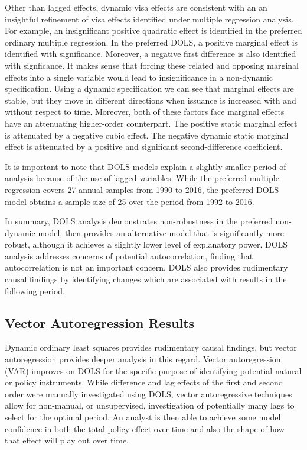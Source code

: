 \documentclass[review]{elsarticle}
\begin{document}
    Other than lagged effects, dynamic visa effects are consistent with an an insightful refinement of
    visa effects identified under multiple regression analysis.
    For example, an insignificant positive quadratic effect is identified in the preferred ordinary multiple regression.
    In the preferred DOLS, a positive marginal effect is identified with significance.
    Moreover, a negative first difference is also identified with signficance.
    It makes sense that forcing these related and opposing marginal effects into a single variable would lead
    to insignificance in a non-dynamic specification.
    Using a dynamic specification we can see that marginal effects are stable,
    but they move in different directions when issuance is increased with and without respect to time.
    Moreover, both of these factors face marginal effects have an attenuating higher-order counterpart.
    The positive static marginal effect is attenuated by a negative cubic effect.
    The negative dynamic static marginal effect is attenuated by a positive and significant second-difference coefficient.

    It is important to note that DOLS models explain a slightly smaller period of analysis because of the use of lagged variables.
    While the preferred multiple regression covers 27 annual samples from 1990 to 2016,
    the preferred DOLS model obtains a sample size of 25 over the period from 1992 to 2016.

    In summary, DOLS analysis demonstrates non-robustness in the preferred non-dynamic model,
    then provides an alternative model that is significantly more robust, although it
    achieves a slightly lower level of explanatory power.
    DOLS analysis addresses concerns of potential autocorrelation,
    finding that autocorrelation is not an important concern.
    DOLS also provides rudimentary causal findings by identifying changes which are associated with results in the following period.

    \subsection{Vector Autoregression Results}

    Dynamic ordinary least squares provides rudimentary causal findings,
    but vector autoregression provides deeper analysis in this regard.
    Vector autoregression (VAR) improves on DOLS for the specific purpose
    of identifying potential natural or policy instruments.
    While difference and lag effects of the first and second order were manually investigated using DOLS,
    vector autoregressive techniques allow for non-manual, or unsupervised,
    investigation of potentially many lags to select for the optimal period.
    An analyst is then able to achieve some model confidence in both the total policy effect over time
    and also the shape of how that effect will play out over time.
    
\end{document}
